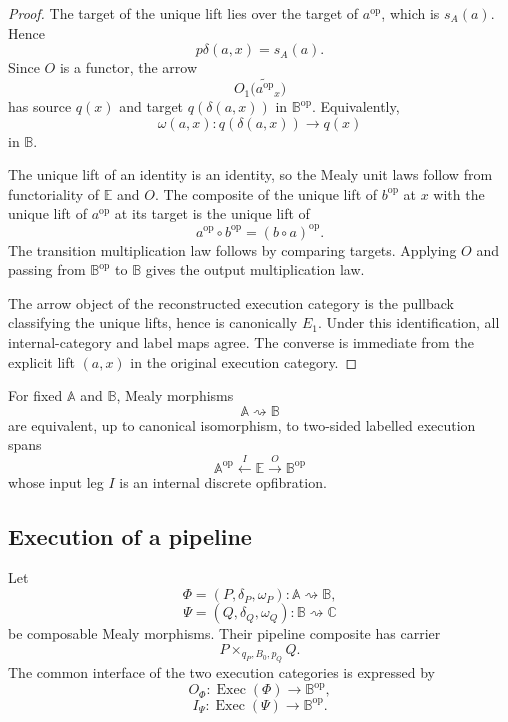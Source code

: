 \begin{proof}
The target of the unique lift lies over the target of \(a^{\mathrm{op}}\),
which is \(s_A(a)\). Hence
\[
    p\delta(a,x)=s_A(a).
\]
Since \(O\) is a functor, the arrow
\[
    O_1\bigl(\widetilde{a^{\mathrm{op}}}_x\bigr)
\]
has source \(q(x)\) and target \(q(\delta(a,x))\) in
\(\mathbb B^{\mathrm{op}}\). Equivalently,
\[
    \omega(a,x):q(\delta(a,x))\to q(x)
\]
in \(\mathbb B\).

The unique lift of an identity is an identity, so the Mealy unit laws follow
from functoriality of \(\mathbb E\) and \(O\). The composite of the unique
lift of \(b^{\mathrm{op}}\) at \(x\) with the unique lift of
\(a^{\mathrm{op}}\) at its target is the unique lift of
\[
    a^{\mathrm{op}}\circ b^{\mathrm{op}}
    =
    (b\circ a)^{\mathrm{op}}.
\]
The transition multiplication law follows by comparing targets. Applying
\(O\) and passing from \(\mathbb B^{\mathrm{op}}\) to \(\mathbb B\)
gives the output multiplication law.

The arrow object of the reconstructed execution category is the pullback
classifying the unique lifts, hence is canonically \(E_1\). Under this
identification, all internal-category and label maps agree. The converse is
immediate from the explicit lift
\((a,x)\) in the original execution category.
\end{proof}

\begin{corollary}
\label{cor:one-cell-execution-representation}
For fixed \(\mathbb A\) and \(\mathbb B\), Mealy morphisms
\[
    \mathbb A\rightsquigarrow\mathbb B
\]
are equivalent, up to canonical isomorphism, to two-sided labelled execution
spans
\[
    \mathbb A^{\mathrm{op}}
    \xleftarrow{\ I\ }
    \mathbb E
    \xrightarrow{\ O\ }
    \mathbb B^{\mathrm{op}}
\]
whose input leg \(I\) is an internal discrete opfibration.
\end{corollary}

\subsection{Execution of a pipeline}
\label{subsec:execution-pipeline}

Let
\[
    \Phi=(P,\delta_P,\omega_P):
    \mathbb A\rightsquigarrow\mathbb B,
\]
\[
    \Psi=(Q,\delta_Q,\omega_Q):
    \mathbb B\rightsquigarrow\mathbb C
\]
be composable Mealy morphisms. Their pipeline composite has carrier
\[
    P\times_{q_P,B_0,p_Q}Q.
\]
The common interface of the two execution categories is expressed by
\[
    O_\Phi:
    \operatorname{Exec}(\Phi)\to\mathbb B^{\mathrm{op}},
\]
\[
    I_\Psi:
    \operatorname{Exec}(\Psi)\to\mathbb B^{\mathrm{op}}.
\]

